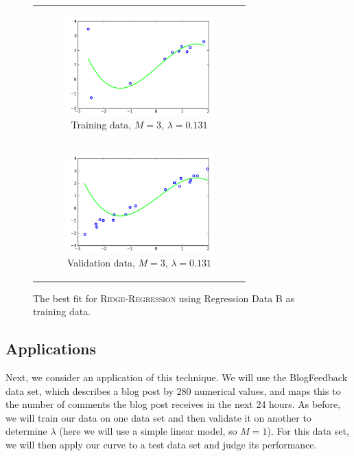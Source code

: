 \documentclass{sigchi}
\begin{document}
\begin{figure}[!t]
\centering
\begin{tabular}{c}

\begin{subfigure}[b]{2.25in}
	\includegraphics[width = 2.25in]{B-3.png}
	\caption{Training data, $M = 3$, $\lambda = 0.131$}
\end{subfigure} \\

\begin{subfigure}[b]{2.25in}
	\includegraphics[width = 2.25in]{BV-3.png}
	\caption{Validation data, $M = 3$, $\lambda = 0.131$}
\end{subfigure} \\

\end{tabular}

\caption{The best fit for \textsc{Ridge-Regression} using Regression Data B as training data.}
\end{figure}


\subsection{Applications}

Next, we consider an application of this technique. We will use the BlogFeedback data set, which describes a blog post by 280 numerical values, and maps this to the number of comments the blog post receives in the next 24 hours. As before, we will train our data on one data set and then validate it on another to determine $\lambda$ (here we will use a simple linear model, so $M = 1$). For this data set, we will then apply our curve to a test data set and judge its performance.
\end{document}
